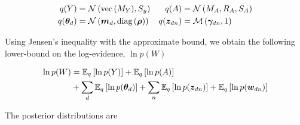 \begin{equation}
\begin{split}
q(Y) &= \nor{\vecf{M_Y}}{S_y} &
q(A) &= \mnor{M_A}{R_A}{S_A} \\
q(\thd) &= \nor{\md}{\diag{\vv{\rho}}} &
q(\zdn) & = \muln{\gdn}{1} \\
\end{split}
\end{equation}


Using Jensen's inequality with the approximate bound, we obtain the following lower-bound on the log-evidence, $\ln p(W)$

\begin{equation}
\begin{split}
\ln p(W) 
&= \ex{\ln p(Y)}{q} + \ex{\ln p(A)}{q} \\
&+ \sum_d \ex{\ln p(\thd)}{q} + \sum_n \ex{\ln p(\zdn)}{q} + \ex{\ln p(\wdn)}{q}
\end{split}
\end{equation}

The posterior distributions are







